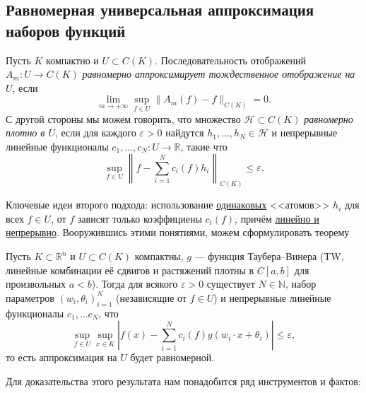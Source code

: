 \documentclass[../NDCNNAI_main.tex]{subfiles}
\begin{document}
\subsection{Равномерная универсальная аппроксимация наборов функций}
\begin{definition}
  Пусть $K$ компактно и $U \subset C(K)$.
  Последовательность отображений $A_m\colon U \to C(K)$ \emph{равномерно аппроксимирует тождественное отображение на $U$}, если
  $$\lim_{m \to +\infty} \sup_{f \in U}\|A_m(f) - f\|_{C(K)} = 0.$$
  С другой стороны мы можем говорить, что множество $\mathcal{H} \subset C(K)$ \emph{равномерно плотно в $U$}, если для каждого $\varepsilon > 0$ найдутся $h_1, \dots, h_N \in \mathcal{H}$ и непрерывные линейные функционалы $c_1, \dots, c_N\colon U \to \mathbb{R}$, такие что
  $$\sup_{f \in U}\left\|f - \sum_{i = 1}^{N}c_i(f)h_i\right\|_{C(K)} \le \varepsilon.$$
\end{definition}
Ключевые идеи второго подхода: использование \underline{одинаковых} <<атомов>> $h_i$ для всех $f \in U$, от $f$ зависят только коэффициены $c_i(f)$, причём \underline{линейно и непрерывно}.
Вооружившись этими понятиями, можем сформулировать теорему
\begin{theorem}
  \label{thm:uat_compact}
  Пусть $K \subset \mathbb{R}^n$ и $U \subset C(K)$ компактны, $g$ --- функция Таубера--Винера (TW, линейные комбинации её сдвигов и растяжений плотны в $C[a, b]$ для произвольных $a < b$).
  Тогда для всякого $\varepsilon > 0$ существует $N \in \mathbb{N}$, набор параметров ${(w_i, \theta_i)}_{i=1}^N$ (независящие от $f \in U$) и непрерывные линейные функционалы $c_1, \dots c_N$, что
  $$\sup_{f \in U}\sup_{x \in K} \left|f(x) - \sum_{i = 1}^{N}c_i(f)g(w_i \cdot x + \theta_i)\right| \le \varepsilon,$$
  то есть аппроксимация на $U$ будет равномерной.
\end{theorem}
Для доказательства этого результата нам понадобится ряд инструментов и фактов:
\end{document}
